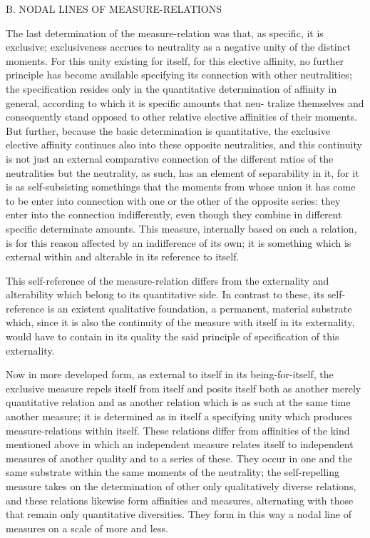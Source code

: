 B. NODAL LINES OF MEASURE-RELATIONS

The last determination of the measure-relation was
that, as specific, it is exclusive;
exclusiveness accrues to neutrality
as a negative unity of the distinct moments.
For this unity existing for itself,
for this elective affinity,
no further principle has become available
specifying its connection with other neutralities;
the specification resides only in
the quantitative determination of affinity in general,
according to which it is specific amounts that neu-
tralize themselves
and consequently stand opposed to other relative elective
affinities of their moments.
But further, because the basic determination is quantitative,
the exclusive elective affinity continues also
into these opposite neutralities,
and this continuity is not just
an external comparative connection of the different ratios
of the neutralities but the neutrality,
as such, has an element of separability in it,
for it is as self-subsisting somethings
that the moments from whose union
it has come to be enter into connection
with one or the other of the opposite series:
they enter into the connection indifferently,
even though they combine in different specific determinate amounts.
This measure, internally based on such a relation,
is for this reason affected by an indifference of its own;
it is something which is external within
and alterable in its reference to itself.

This self-reference of the measure-relation differs
from the externality and alterability
which belong to its quantitative side.
In contrast to these, its self-reference is
an existent qualitative foundation,
a permanent, material substrate
which, since it is also the continuity of
the measure with itself in its externality,
would have to contain in its quality the said
principle of specification of this externality.

Now in more developed form, as external
to itself in its being-for-itself,
the exclusive measure repels itself from itself
and posits itself both as another merely quantitative relation
and as another relation which is as such
at the same time another measure;
it is determined as in itself a specifying unity
which produces measure-relations within itself.
These relations differ from affinities of
the kind mentioned above in which
an independent measure relates itself
to independent measures of another quality
and to a series of these.
They occur in one and the same substrate
within the same moments of the neutrality;
the self-repelling measure takes on the determination
of other only qualitatively diverse relations,
and these relations likewise form affinities and measures,
alternating with those that remain only quantitative diversities.
They form in this way a nodal line of measures
on a scale of more and less.

